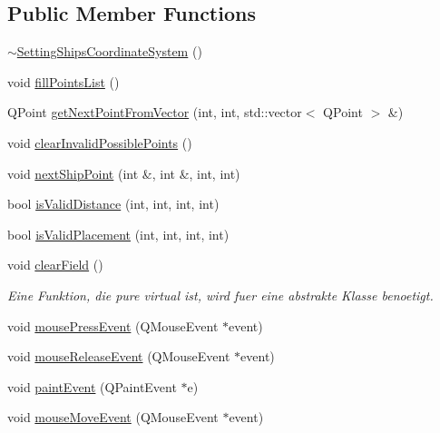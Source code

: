 \subsection*{Public Member Functions}
\begin{DoxyCompactItemize}
\item 
\hyperlink{classGUI_1_1SettingShipsCoordinateSystem_a1043bd36a10f81e768fd9378d870d639}{$\sim$\+Setting\+Ships\+Coordinate\+System} ()
\item 
void \hyperlink{classGUI_1_1SettingShipsCoordinateSystem_abcb8de61d1e6998fbc06813adfebde57}{fill\+Points\+List} ()
\item 
Q\+Point \hyperlink{classGUI_1_1SettingShipsCoordinateSystem_a98993f7ed1af6efcbdc1e75414ccd7c8}{get\+Next\+Point\+From\+Vector} (int, int, std\+::vector$<$ Q\+Point $>$ \&)
\item 
void \hyperlink{classGUI_1_1SettingShipsCoordinateSystem_a72b3b7dabd8a31aa0ce42d064ac9abc3}{clear\+Invalid\+Possible\+Points} ()
\item 
void \hyperlink{classGUI_1_1SettingShipsCoordinateSystem_abcd1d610fb9754e26e40919bb75e62e8}{next\+Ship\+Point} (int \&, int \&, int, int)
\item 
bool \hyperlink{classGUI_1_1SettingShipsCoordinateSystem_a41d94ca8a060a8d13c88593cecb38f4a}{is\+Valid\+Distance} (int, int, int, int)
\item 
bool \hyperlink{classGUI_1_1SettingShipsCoordinateSystem_af059c33f0621f128e60e5152e5778ec6}{is\+Valid\+Placement} (int, int, int, int)
\item 
void \hyperlink{classGUI_1_1SettingShipsCoordinateSystem_afcf62685a11ce5529786cc14ddecc7f2}{clear\+Field} ()
\begin{DoxyCompactList}\small\item\em Eine Funktion, die pure virtual ist, wird fuer eine abstrakte Klasse benoetigt. \end{DoxyCompactList}\item 
void \hyperlink{classGUI_1_1SettingShipsCoordinateSystem_ad2272e344e46519f026cd02f419884f1}{mouse\+Press\+Event} (Q\+Mouse\+Event $\ast$event)
\item 
void \hyperlink{classGUI_1_1SettingShipsCoordinateSystem_a35226f6549add1ff837c65888fcd00fc}{mouse\+Release\+Event} (Q\+Mouse\+Event $\ast$event)
\item 
void \hyperlink{classGUI_1_1SettingShipsCoordinateSystem_a4c44746ee6abcfabac1581977a1b5c02}{paint\+Event} (Q\+Paint\+Event $\ast$e)
\item 
void \hyperlink{classGUI_1_1SettingShipsCoordinateSystem_ae820c6a86f0a1908bf451f86db043489}{mouse\+Move\+Event} (Q\+Mouse\+Event $\ast$event)
\end{DoxyCompactItemize}
